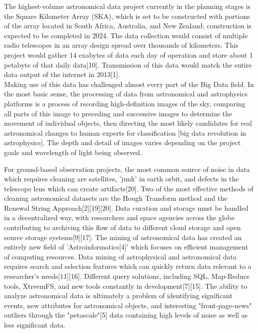 \documentclass[letterpaper]{report}
\begin{document}
The highest-volume astronomical data project currently in the planning stages is the Square Kilometer Array (SKA), which is set to be constructed with portions of the array located in South Africa, Australia, and New Zealand; construction is expected to be completed in 2024. The data collection would consist of multiple radio telescopes in an array design spread over thousands of kilometers. This project would gather 14 exabytes of data each day of operation and store about 1 petabyte of that daily data[10]. Transmission of this data would match the entire data output of the internet in 2013[1]. \\

Making use of this data has challenged almost every part of the Big Data field. In the most basic sense, the processing of data from astronomical and astrophysics platforms is a process of recording high-definition images of the sky, comparing all parts of this image to preceding and successive images to determine the movement of individual objects, then directing the most likely candidates for real astronomical changes to human experts for classification [big data revolution in astrophysics]. The depth and detail of images varies depending on the project goals and wavelength of light being observed. 

For ground-based observation projects, the most common source of noise in data which requires cleaning are satellites, 'junk' in earth orbit, and defects in the telescope lens which can create artifacts[20]. Two of the most effective methods of cleaning astronomical datasets are the Hough Transform method and the Renewal String Approach[2][19][20]. Data curation and storage must be handled in a decentralized way, with researchers and space agencies across the globe contributing to archiving this flow of data to different cloud storage and open source storage systems[9][17]. The mining of astronomical data has created an entirely new field of 'Astroinformatics[4]' which focuses on efficient management of computing resources. Data mining of astrophysical and astronomical data requires search and selection features which can quickly return data relevant to a researcher's needs[11][16]. Different query solutions, including SQL, Map-Reduce tools, XtreemFS, and new tools constantly in development[7][15]. The ability to analyze astronomical data is ultimately a problem of identifying significant events, new attributes for astronomical objects, and interesting "front-page-news" outliers through the "petascale"[5] data containing high levels of noise as well as less significant data.
 
\end{document}
